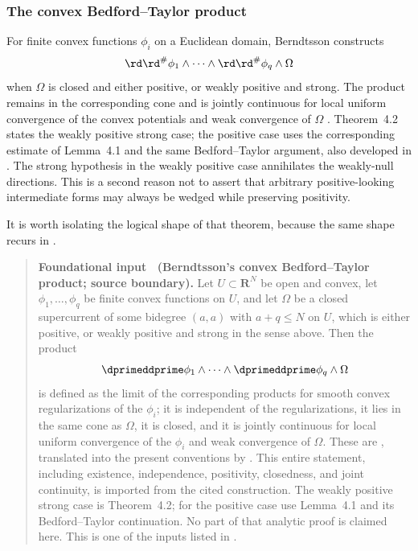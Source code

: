 \subsubsection{The convex Bedford--Taylor product}

For finite convex functions $\phi_i$ on a Euclidean domain, Berndtsson
constructs
\[
       \rd\rd^\#\phi_1\wedge\cdots\wedge \rd\rd^\#\phi_q\wedge\Omega
\]
when $\Omega$ is closed and either positive, or weakly positive and strong.
The product remains in the corresponding cone and is jointly continuous for
local uniform convergence of the convex potentials and weak convergence of
$\Omega$ \cite[Lemma~4.1 and Theorem~4.2]{Ber26Convex}.
Theorem~4.2 states the weakly positive strong case; the positive case
uses the corresponding estimate of Lemma~4.1 and the same
Bedford--Taylor argument, also developed in \cite{Lag12Super}.
The strong hypothesis in the
weakly positive case annihilates the weakly-null directions.  This is a
second reason not to assert that arbitrary positive-looking intermediate
forms may always be wedged while preserving positivity.

It is worth isolating the logical shape of that theorem, because the same
shape recurs in .

\label{thm:ch14-convex-bt-imported}
\begin{quote}
\textbf{Foundational input \thetheorem\ (Berndtsson's convex
Bedford--Taylor product; source boundary).}
Let $U\subset\mathbf R^N$ be open and convex, let
$\phi_1,\ldots,\phi_q$ be finite convex functions on $U$, and let $\Omega$ be
a closed supercurrent of some bidegree $(a,a)$ with $a+q\le N$ on $U$, which
is either
positive, or weakly positive and strong in the sense above.  Then the product
\[
 \dprimeddprime\phi_1\wedge\cdots\wedge\dprimeddprime\phi_q\wedge\Omega
\]
is defined as the limit of the corresponding products for smooth convex
regularizations of the $\phi_i$; it is independent of the regularizations, it
lies in the same cone as $\Omega$, it is closed, and it is jointly continuous
for local uniform convergence of the $\phi_i$ and weak convergence of
$\Omega$. These are \cite[Lemma~4.1 and Theorem~4.2]{Ber26Convex},
translated into the
present conventions by .  This entire
statement, including existence, independence, positivity, closedness, and
joint continuity, is imported from the cited construction. The weakly
positive strong case is Theorem~4.2; for the positive case use
Lemma~4.1 and its Bedford--Taylor continuation. No part of that analytic
proof is claimed here. This is one of the inputs listed in
.
\end{quote}

